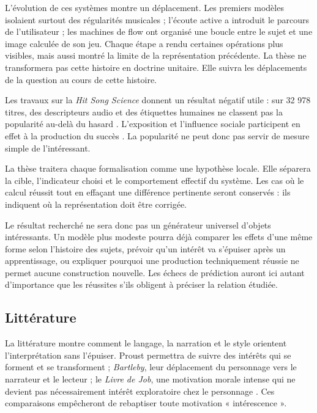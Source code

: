 \documentclass[11pt,a4paper]{article}
\begin{document}
L'évolution de ces systèmes montre un déplacement. Les premiers modèles isolaient
surtout des régularités musicales ; l'écoute active a introduit le
parcours de l'utilisateur ; les machines de flow ont organisé une boucle entre
le sujet et une image calculée de son jeu. Chaque étape a rendu certaines
opérations plus visibles, mais aussi montré la limite de la représentation
précédente. La thèse ne transformera pas cette histoire en doctrine unitaire.
Elle suivra les déplacements de la question au cours de cette histoire.

Les travaux sur la \emph{Hit Song Science} donnent un résultat négatif utile :
sur 32 978 titres, des descripteurs audio et des étiquettes humaines ne classent
pas la popularité au-delà du hasard \parencite{pachetroy2008hitsong}. L'exposition
et l'influence sociale participent en effet à la production du succès
\parencite{pachet2011hitsong}. La popularité ne peut donc pas servir de mesure
simple de l'intéressant.

La thèse traitera chaque formalisation comme une hypothèse locale. Elle séparera
la cible, l'indicateur choisi et le comportement effectif du système. Les cas où
le calcul réussit tout en effaçant une différence pertinente seront conservés :
ils indiquent où la représentation doit être corrigée.

Le résultat recherché ne sera donc pas un générateur universel d'objets
intéressants. Un modèle plus modeste pourra déjà comparer les effets d'une même
forme selon l'histoire des sujets, prévoir qu'un intérêt va s'épuiser après un
apprentissage, ou expliquer pourquoi une production techniquement réussie ne
permet aucune construction nouvelle. Les échecs de prédiction auront ici autant
d'importance que les réussites s'ils obligent à préciser la relation étudiée.

\subsection{Littérature}

La littérature montre comment le langage, la narration et le style orientent
l'interprétation sans l'épuiser. Proust permettra de suivre des intérêts qui se
forment et se transforment ; \emph{Bartleby}, leur déplacement du personnage
vers le narrateur et le lecteur ; le \emph{Livre de Job}, une motivation morale
intense qui ne devient pas nécessairement intérêt exploratoire chez le
personnage \parencite{jps1985tanakh}. Ces comparaisons empêcheront de rebaptiser
toute motivation « intérescence ».
\end{document}

